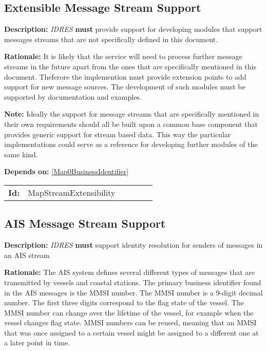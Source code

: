 \subsection{Extensible Message Stream Support}\label{MapStreamExtensibility}
\textbf{Description:} \textsl{IDRES} \textbf{must} provide support for developing modules that support messages streams that are not specifically  defined in this document.

\textbf{Rationale:} It is likely that the service will need to process further  message streams in the future apart from the ones that are specifically  mentioned in this document. Theferore the implemention must provide  extension points to add support for new message sources. The development of such modules must be supported by documentation and examples. 

\textbf{Note:} Ideally the support for message streams that are specifically mentioned in their own requirements should all be built upon a common base component that provides generic support  for stream based data. This way the particular implementations could serve as a reference for developing further modules of the same kind.

\textbf{Depends on:} \ref{Map0BusinessIdentifier} 

\par
{\small \begin{center}\begin{tabular}{rlrlrl}
\textbf{Id:} & MapStreamExtensibility  & & & \end{tabular}\end{center} }

\subsection{AIS Message Stream Support}\label{MapStreamTypeAis}
\textbf{Description:} \textsl{IDRES} \textbf{must} support identity resolution for  senders of messages in an AIS stream

\textbf{Rationale:} The AIS system defines several different types of messages that are transmitted by vessels and coastal stations. The primary business identifier found in the AIS messages is the MMSI number. The MMSI number is  a 9-digit decimal number. The first three digits correspond to the flag  state of the vessel. The MMSI number can change over the lifetime of the  vessel, for example when the vessel changes flag state. MMSI numbers can be reused, meaning that an MMSI that was once assigned to a certain vessel might be assigned to a different one at a later point in time. 

